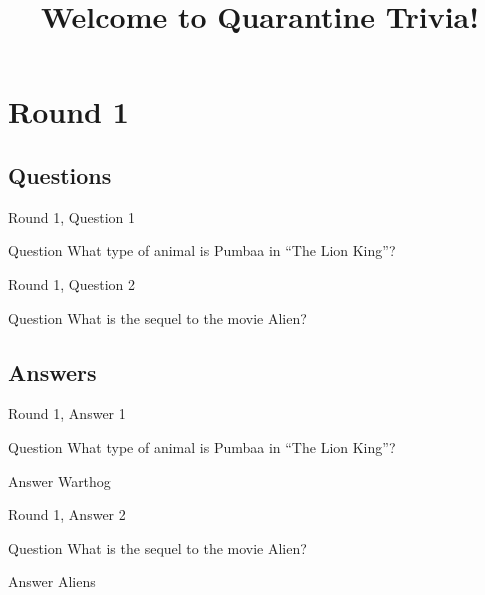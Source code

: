 \documentclass[11pt]{beamer}
\begin{document}
\title{Welcome to Quarantine Trivia!}
\date{}

\begin{frame}
  \titlepage{}
\end{frame}


\section{Round 1}

\subsection{Questions}

\begin{frame}[t]{Round 1, Question 1}
  \vspace{2em}
  \begin{block}{Question}
    What type of animal is Pumbaa in ``The Lion King''\@?
  \end{block}
\end{frame}


\begin{frame}[t]{Round 1, Question 2}
  \vspace{2em}
  \begin{block}{Question}
    What is the sequel to the movie Alien\@?
  \end{block}
\end{frame}

\subsection{Answers}

\begin{frame}[t]{Round 1, Answer 1}
  \vspace{2em}
  \begin{block}{Question}
    What type of animal is Pumbaa in ``The Lion King''\@?
  \end{block}
  \pause{}
  \begin{block}{Answer}
    Warthog
  \end{block}
\end{frame}


\begin{frame}[t]{Round 1, Answer 2}
  \vspace{2em}
  \begin{block}{Question}
    What is the sequel to the movie Alien\@?
  \end{block}
  \pause{}
  \begin{block}{Answer}
    Aliens
  \end{block}
\end{frame}
\end{document}
